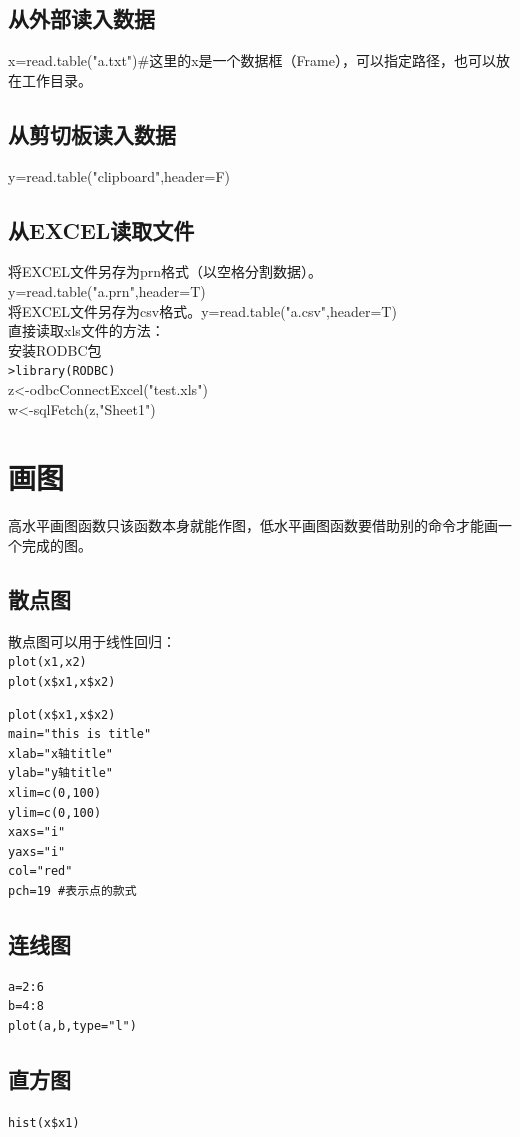 \documentclass[a4paper,12pt]{ctexbook}
\begin{document}
\begin{flushleft}
\subsection{从外部读入数据}
x=read.table("a.txt")\#这里的x是一个数据框（Frame），可以指定路径，也可以放在工作目录。
\subsection{从剪切板读入数据}
y=read.table("clipboard",header=F)
\subsection{从EXCEL读取文件}
将EXCEL文件另存为prn格式（以空格分割数据）。y=read.table("a.prn",header=T)\\
将EXCEL文件另存为csv格式。y=read.table("a.csv",header=T)\\

直接读取xls文件的方法：\\
安装RODBC包\\
\verb|>library(RODBC)|\\
z<-odbcConnectExcel("test.xls")\\
w<-sqlFetch(z,"Sheet1")

\section{画图}
高水平画图函数只该函数本身就能作图，低水平画图函数要借助别的命令才能画一个完成的图。

\subsection{散点图}
散点图可以用于线性回归：\\
\verb|plot(x1,x2)|\\
\verb|plot(x$x1,x$x2)|
\begin{verbatim}
plot(x$x1,x$x2)
main="this is title"
xlab="x轴title"
ylab="y轴title"
xlim=c(0,100)
ylim=c(0,100)
xaxs="i"
yaxs="i"
col="red"
pch=19 #表示点的款式
\end{verbatim}

\subsection{连线图}
\begin{verbatim}
a=2:6
b=4:8
plot(a,b,type="l")
\end{verbatim}

\subsection{直方图}
\verb|hist(x$x1)|


\end{flushleft}
\end{document}
